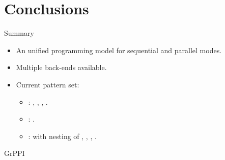 \section{Conclusions}

\begin{frame}[t]{Summary}
\begin{itemize}
  \item An unified programming model for sequential and parallel modes.
  \item Multiple back-ends available.
  \item Current pattern set:
    \begin{itemize}
      \item {}: , , , .
      \item {}: .
      \item {}:  with nesting of , ,
            , .
    \end{itemize}
\end{itemize}
\end{frame}

\begin{frame}{GrPPI}
\begin{Large}
\end{Large}
\end{frame}
